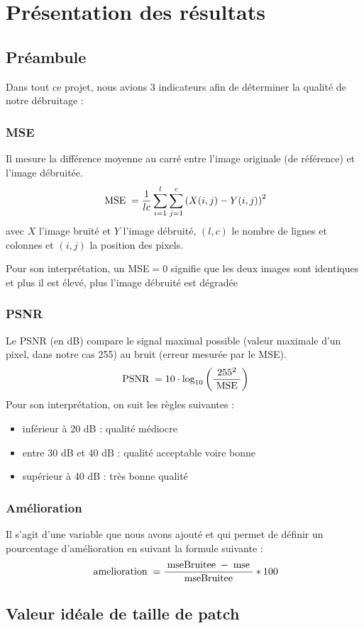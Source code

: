 \section{Présentation des résultats}
\subsection{Préambule}
Dans tout ce projet, nous avions 3 indicateurs afin de déterminer la qualité de notre débruitage :
\subsubsection{MSE} 
Il mesure la différence moyenne au carré entre l'image originale (de référence) et l'image débruitée.
 \[
    \;\text{MSE}\;= \dfrac{1}{lc}\sum_{i=1}^{l}\sum_{j=1}^{c}\left( X(i,j)-Y(i,j) \right)^2
 \]
 avec \(X\) l'image bruité et \(Y\) l'image débruité, \((l,c)\) le nombre de lignes et colonnes et \((i,j)\) la position des pixels. \par
 Pour son interprétation, un MSE\(=0\) signifie que les deux images sont identiques et plus il est élevé, plus l'image débruité est dégradée
 \subsubsection{PSNR}
 Le PSNR (en dB) compare le signal maximal possible (valeur maximale d'un pixel, dans notre cas 255) au bruit (erreur mesurée par le MSE).
 \[
    \;\text{PSNR}\;=10\cdot\log_{10}\left( \dfrac{255^2}{\;\text{MSE}\;} \right)
 \]
Pour son interprétation, on suit les règles suivantes :
\begin{itemize}
    \item inférieur à 20 dB : qualité médiocre
    \item entre 30 dB et 40 dB : qualité acceptable voire bonne
    \item supérieur à 40 dB : très bonne qualité
\end{itemize}

\subsubsection{Amélioration}
Il s'agit d'une variable que nous avons ajouté et qui permet de définir un pourcentage d'amélioration en suivant la formule suivante :
\[
    \;\text{amelioration}\; = \dfrac{\;\text{mseBruitee}\; - \;\text{mse}\;}{\;\text{mseBruitee}\;}*100
\]
 
\subsection{Valeur idéale de taille de patch}

